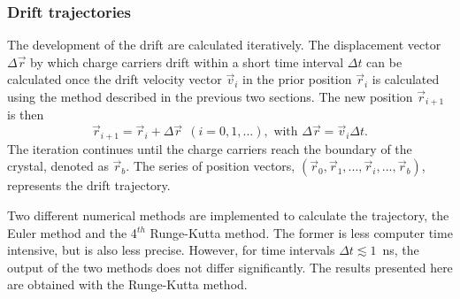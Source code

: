 \documentclass[epj]{svjour}
\begin{document}
\subsubsection{Drift trajectories} 
\label{s:trj} 
The development of the drift are calculated iteratively. The
displacement vector $\Delta \vec{r}$ by which charge carriers drift
within a short time interval $\Delta t$ can be calculated once the
drift velocity vector $\vec{v}_{i}$ in the prior position
$\vec{r}_{i}$ is calculated using the method described in the previous
two sections.  The new position $\vec{r}_{i+1}$ is then
\begin{equation} 
\label{e:pos} 
\vec{r}_{i+1} = \vec{r}_{i} + \Delta \vec{r} \ \ 
(i=0,1,...), \mbox{ with } 
\Delta \vec{r} = \vec{v}_{i} \Delta t. 
\end{equation} 
The iteration continues until the charge carriers reach the boundary
of the crystal, denoted as $\vec{r}_{b}$. The series of position
vectors, $(\vec{r}_{0}, \vec{r}_{1}, ..., \vec{r}_{i}, ...,
\vec{r}_{b})$, represents the drift trajectory.
 
Two different numerical methods are implemented to calculate the
trajectory, the Euler method and the 4$^{th}$ Runge-Kutta method. The
former is less computer time intensive, but is also less precise.
However, for time intervals $\Delta t \lesssim 1$~ns, the output of
the two methods does not differ significantly. The results presented
here are obtained with the Runge-Kutta method.
 
\end{document}
